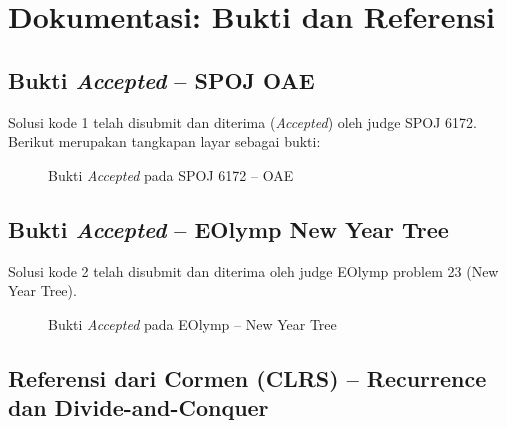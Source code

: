 \documentclass[12pt,a4paper]{article}
\theoremstyle{definition}
\begin{document}
\section{Dokumentasi: Bukti dan Referensi}

\subsection{Bukti \textit{Accepted} -- SPOJ OAE}

Solusi kode 1 telah disubmit dan diterima (\emph{Accepted}) oleh judge SPOJ 6172.
Berikut merupakan tangkapan layar sebagai bukti:

\begin{figure}[H]
  \centering
  \caption{Bukti \emph{Accepted} pada SPOJ 6172 -- OAE}
\end{figure}

\subsection{Bukti \textit{Accepted} -- EOlymp New Year Tree}

Solusi kode 2 telah disubmit dan diterima oleh judge EOlymp problem 23 (New Year
Tree).

\begin{figure}[H]
  \centering
  \caption{Bukti \emph{Accepted} pada EOlymp -- New Year Tree}
\end{figure}

\subsection{Referensi dari Cormen (CLRS) -- Recurrence dan Divide-and-Conquer}
\end{document}

